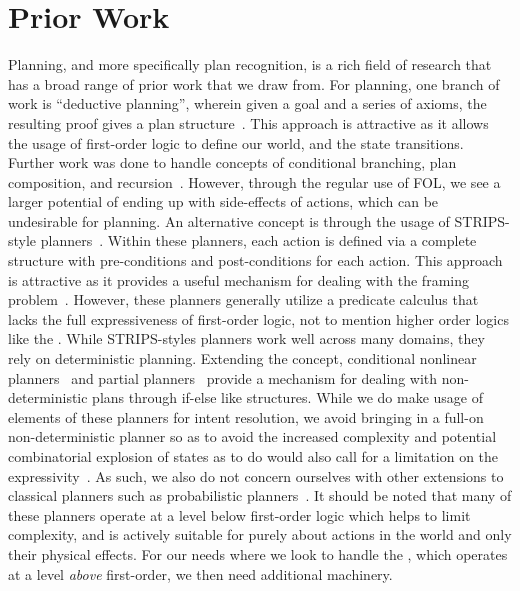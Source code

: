 \section{Prior Work}

Planning, and more specifically plan recognition, is a rich field of
research that has a broad range of prior work that we draw from. For planning,
one branch of work is ``deductive planning'', wherein given a goal and a series 
of axioms,
the resulting proof gives a plan structure~\cite{green_application_1969}. This
approach is attractive as it allows the usage of first-order logic to define
our world, and the state transitions. Further work was done to handle concepts
of conditional branching, plan composition, and 
recursion~\cite{metzing_plan_1989,biundo_deductive_1992,rosenschein_plan_1981}.
However, through the regular use of FOL, we see a larger potential of ending
up with side-effects of actions, which can be undesirable for planning. An
alternative concept is through the usage of STRIPS-style 
planners~\cite{fikes_strips_1971}. Within these planners, each action is
defined via a complete structure with pre-conditions and post-conditions for
each action. This approach is attractive as it provides a useful mechanism for
dealing with the framing problem~\cite{mccarthy_philosophical_1969}. However,
these planners generally utilize a predicate calculus that lacks the full
expressiveness of first-order logic, not to mention higher order logics like
the \CEC. While STRIPS-styles planners work well across many domains, they
rely on deterministic planning. Extending the concept, conditional nonlinear
planners~\cite{peot_conditional_1992} and partial 
planners~\cite{pryor_planning_1996}
provide a mechanism for dealing with non-deterministic plans through if-else
like structures. While we do make usage of elements of these planners for
intent resolution, we avoid bringing in a full-on non-deterministic planner
so as to avoid the increased complexity and potential combinatorial explosion
of states as to do would also call for a limitation on the
expressivity~\cite{rintanen_constructing_1999}. As such, we also do
not concern ourselves with other extensions to classical planners such as 
probabilistic 
planners~\cite{boutilier_decision-theoretic_1999,kaelbling_planning_1998}.
It should be noted that many of these planners operate at a level below
first-order logic which helps to limit complexity, and is actively suitable
for purely about actions in the world and only their physical effects. For
our needs where we look to handle the \CEC, which operates at a level
\emph{above} first-order, we then need additional machinery.


